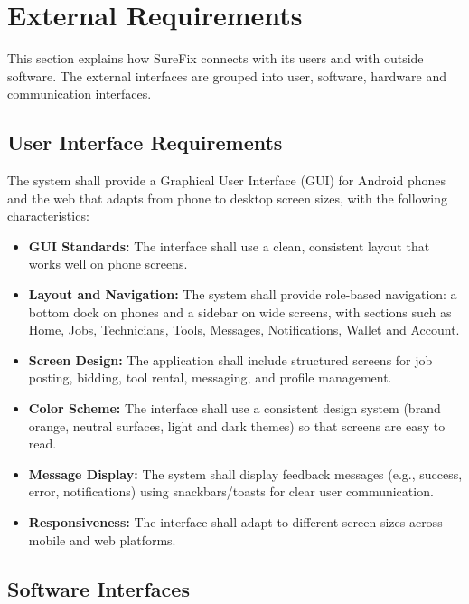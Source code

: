\documentclass[A4paper,12pt]{report}
\theoremstyle{plain}
\theoremstyle{definition}
\theoremstyle{remark}
\numberwithin{equation}{section}
\begin{document}
\section{External Requirements}

This section explains how SureFix connects with its users and with outside software. The external interfaces are grouped into user, software, hardware and communication interfaces.

\subsection{User Interface Requirements}

The system shall provide a Graphical User Interface (GUI) for Android phones and the web that adapts from phone to desktop screen sizes, with the following characteristics:

\begin{itemize}
    \item \textbf{GUI Standards:} The interface shall use a clean, consistent layout that works well on phone screens.
    
        \item \textbf{Layout and Navigation:} The system shall provide role-based navigation: a bottom dock on phones and a sidebar on wide screens, with sections such as Home, Jobs, Technicians, Tools, Messages, Notifications, Wallet and Account.
    
    \item \textbf{Screen Design:} The application shall include structured screens for job posting, bidding, tool rental, messaging, and profile management.
    
        \item \textbf{Color Scheme:} The interface shall use a consistent design system (brand orange, neutral surfaces, light and dark themes) so that screens are easy to read.
    
    \item \textbf{Message Display:} The system shall display feedback messages (e.g., success, error, notifications) using snackbars/toasts for clear user communication.
    
    \item \textbf{Responsiveness:} The interface shall adapt to different screen sizes across mobile and web platforms.
\end{itemize}

\subsection{Software Interfaces}
\end{document}
